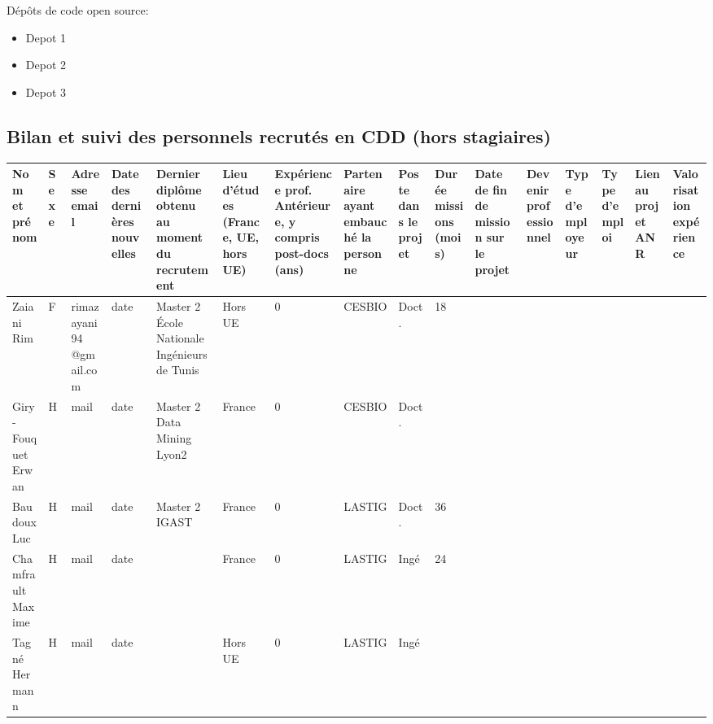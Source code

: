 Dépôts de code open source:
\begin{itemize}
    \item Depot 1
    \item Depot 2
    \item Depot 3
\end{itemize}
\newpage
\begin{landscape}
\subsection{Bilan et suivi des personnels recrutés en CDD (hors stagiaires)}



\begin{table}[htbp]
\footnotesize
    \centering
    \begin{tabular}{|p{1.85cm}|p{0.65cm}|p{1.5cm}|p{1.15cm}|p{1.75cm}|p{1.25cm}|p{1.75cm}|p{1.3cm}|p{1.35cm}|p{1.35cm}|p{1.35cm}|p{1.25cm}|p{1.25cm}|p{1.25cm}|p{1.5cm}|p{1.5cm}|}
    \hline
Nom et prénom & Sexe& Adresse email & Date des dernières nouvelles
 & Dernier diplôme obtenu au moment du recrutement  & 
Lieu d'études (France, UE, hors UE)  & 
Expérience prof. Antérieure, y compris post-docs (ans)  & 
Partenaire ayant embauché la personne  & 
Poste dans le projet  & 
Durée  missions (mois)  & 
Date de fin de mission sur le projet & 
Devenir professionnel & 
Type d’employeur & 
Type d’emploi  & 
Lien au projet ANR & 
Valorisation expérience \\\hline

Zaiani Rim&F&rimazayani94 @gmail.com&date&Master 2 École Nationale Ingénieurs de Tunis&Hors UE&0&CESBIO&Doct.&18&&&&&&\\\hline
Giry-Fouquet Erwan&H&mail&date&Master 2 Data Mining Lyon2&France&0&CESBIO&Doct.&&&&&&&\\\hline
Baudoux Luc&H&mail&date&Master 2 IGAST&France&0&LASTIG&Doct.&36&&&&&&\\\hline
Chamfrault Maxime&H&mail&date&&France&0&LASTIG&Ingé&24&&&&&&\\\hline
Tagné Hermann&H&mail&date&&Hors UE&0&LASTIG&Ingé&&&&&&&\\

\hline
    \end{tabular}
    \label{tab:people}
\end{table}

\end{landscape}

